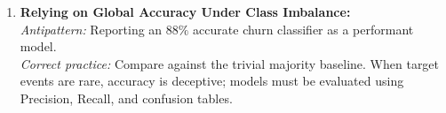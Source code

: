 \documentclass[11pt,a4paper]{article}
\begin{document}
\begin{enumerate}[leftmargin=*]
    \item \textbf{Relying on Global Accuracy Under Class Imbalance:}\\
    \textit{Antipattern:} Reporting an $88\%$ accurate churn classifier as a performant model.\\
    \textit{Correct practice:} Compare against the trivial majority baseline. When target events are rare, accuracy is deceptive; models must be evaluated using Precision, Recall, and confusion tables.
\end{enumerate}
\end{document}
